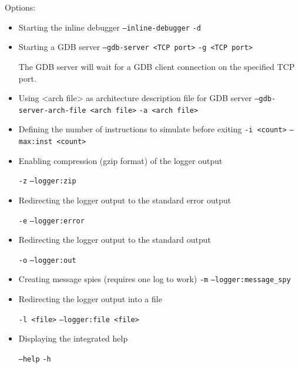 Options:
\begin{itemize}
\item Starting the inline debugger
\texttt{--inline-debugger}
\texttt{-d}

\item Starting a GDB server
\texttt{--gdb-server <TCP port>}
\texttt{-g <TCP port>}

The GDB server will wait for a GDB client connection on the specified TCP port.

\item Using <arch file> as architecture description file for GDB server
\texttt{--gdb-server-arch-file <arch file>}
\texttt{-a  <arch file>}

\item Defining the number of instructions to simulate before exiting
\texttt{-i <count>}
\texttt{--max:inst <count>}

\item Enabling compression (gzip format) of the logger output

\texttt{-z}
\texttt{--logger:zip}

\item Redirecting the logger output to the standard error output

\texttt{-e}
\texttt{--logger:error}

\item Redirecting the logger output to the standard output

\texttt{-o}
\texttt{--logger:out}

\item Creating message spies (requires one log to work)
\texttt{-m}
\texttt{--logger:message\_spy}

\item Redirecting the logger output into a file

\texttt{-l <file>}
\texttt{--logger:file <file>}

\item Displaying the integrated help

\texttt{--help}
\texttt{-h}

\end{itemize}